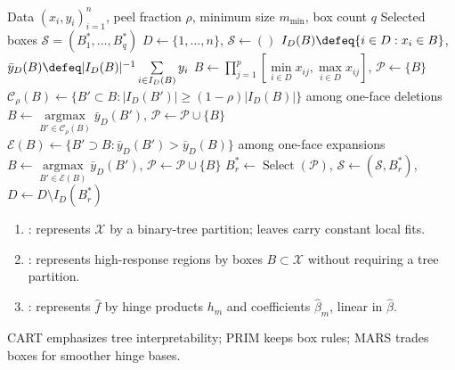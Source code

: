 \begin{breakablealgorithm}
\caption{Patient Rule Induction Method}
\label{alg:sl-prim-box-peeling}
\begin{algorithmic}
\Require Data $(x_i,y_i)_{i=1}^n$, peel fraction $\rho$, minimum size $m_{\min}$, box count $q$
\Ensure Selected boxes $\mathcal S=(B_1^*,\ldots,B_q^*)$
\State $D\gets\{1,\ldots,n\}$, $\mathcal S\gets()$
\State $I_D(B)\defeq\{i\in D:x_i\in B\}$, $\bar y_D(B)\defeq |I_D(B)|^{-1}\sum\limits_{i\in I_D(B)}y_i$
\State $B\gets\prod\limits_{j=1}^p[\min\limits_{i\in D}x_{ij},\max\limits_{i\in D}x_{ij}]$, $\mathcal P\gets\{B\}$
\Repeat
\State $\mathcal C_\rho(B)\gets\{B'\subset B: |I_D(B')|\ge(1-\rho)|I_D(B)|\}$ among one-face deletions
\State $B\gets\operatorname*{argmax}\limits_{B'\in\mathcal C_\rho(B)}\bar y_D(B')$, $\mathcal P\gets\mathcal P\cup\{B\}$
\State $\mathcal E(B)\gets\{B'\supset B: \bar y_D(B')>\bar y_D(B)\}$ among one-face expansions
\State $B\gets\operatorname*{argmax}\limits_{B'\in\mathcal E(B)}\bar y_D(B')$, $\mathcal P\gets\mathcal P\cup\{B\}$
\EndIf
\State $B_r^*\gets\operatorname{Select}(\mathcal P)$, $\mathcal S\gets(\mathcal S,B_r^*)$, $D\gets D\setminus I_D(B_r^*)$
\EndFor
\end{algorithmic}
\end{breakablealgorithm}

\begin{remark} \label{rem:sl-adaptive-methods-versus-trees} 
\begin{enumerate}[label=(\roman*)]
\setlength{\itemsep}{0pt}
\item {}: represents $\mathcal X$ by a binary-tree partition; leaves carry constant local fits.
\item {}: represents high-response regions by boxes $B\subset\mathcal X$ without requiring a tree partition.
\item {}: represents $\widehat f$ by hinge products $h_m$ and coefficients $\widehat\beta_m$, linear in $\widehat\beta$.
\end{enumerate}
CART emphasizes tree interpretability; PRIM keeps box rules; MARS trades boxes for smoother hinge bases.
\end{remark}

